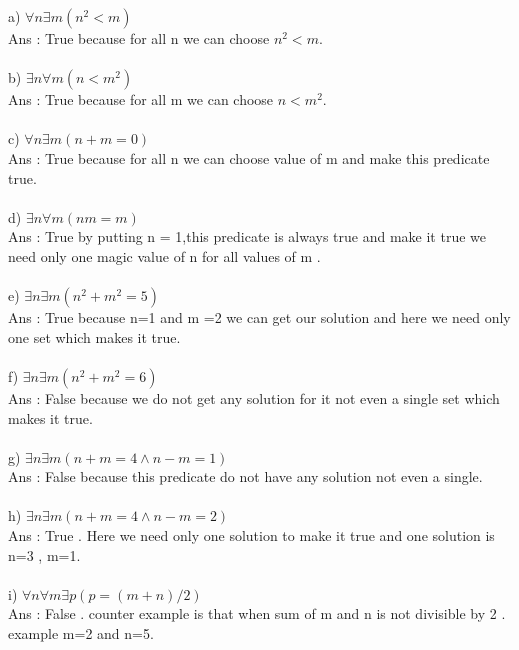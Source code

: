 \documentclass{article}
\begin{document}
a) $\forall n \exists m ( n^2 < m)$ \\
Ans : True because for all n we can choose  $ n^2 <m . $ \\
\\ 
b) $\exists n \forall m (n <m ^2) $ \\ 
Ans : True because for all m we can choose  $ n < m^2  .$ \\
\\  
c) $\forall n \exists m  (n+ m =0) $\\ 
Ans : True because for all n we can choose value of m and make this predicate true.\\
\\
d) $\exists n \forall m (nm=m)  $\\  
Ans : True  by putting n = 1,this predicate is always true and make it true we need only one  magic value of n for all values of m . \\
\\
e) $\exists n \exists m (n^2 + m^2 = 5) $  \\ 
Ans : True because   n=1 and   m =2 we can get our solution and here we need only one set which makes it true.\\
\\
f) $\exists n \exists m  (n^2 + m^2 =6) $ \\
Ans : False because we do not get any solution for it not even a single set which makes it true.\\
\\
g) $\exists n \exists m (n+m =4 \wedge n-m =1 )  $ \\
Ans : False because this predicate do not have any solution not even a single. \\
\\
h) $\exists n \exists m   (n+m =4 \wedge n-m =2 )$ \\
Ans : True . Here we need only one solution to make it true and one solution is n=3 , m=1.\\
\\
i) $\forall n \forall m \exists p   (p=(m+n)/2) $\\
Ans : False  . counter example is  that when  sum of m and n is not divisible by 2 . example m=2 and n=5. \\
\\
\end{document}
